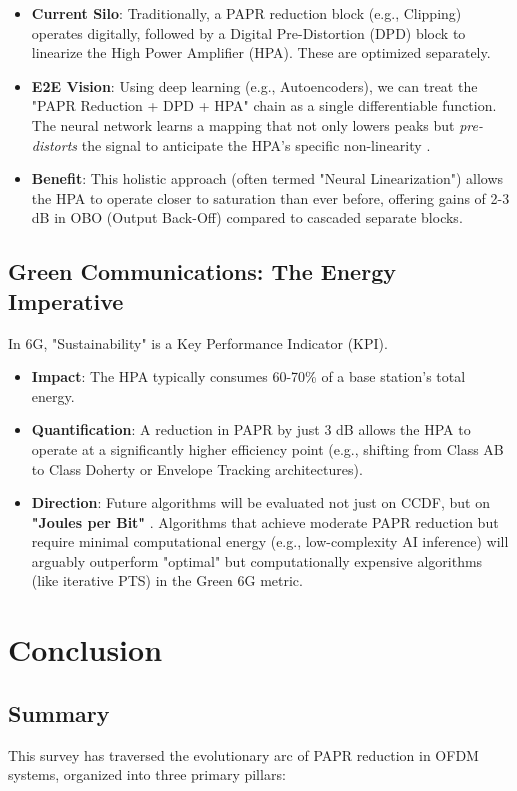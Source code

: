 \documentclass[journal]{IEEEtran}
\begin{document}
\begin{itemize}
    \item \textbf{Current Silo}: Traditionally, a PAPR reduction block (e.g., Clipping) operates digitally, followed by a Digital Pre-Distortion (DPD) block to linearize the High Power Amplifier (HPA). These are optimized separately.
    \item \textbf{E2E Vision}: Using deep learning (e.g., Autoencoders), we can treat the "PAPR Reduction + DPD + HPA" chain as a single differentiable function. The neural network learns a mapping that not only lowers peaks but \textit{pre-distorts} the signal to anticipate the HPA's specific non-linearity \cite{ref13}.
    \item \textbf{Benefit}: This holistic approach (often termed "Neural Linearization") allows the HPA to operate closer to saturation than ever before, offering gains of 2-3 dB in OBO (Output Back-Off) compared to cascaded separate blocks.
\end{itemize}

\subsection{Green Communications: The Energy Imperative}
In 6G, "Sustainability" is a Key Performance Indicator (KPI).

\begin{itemize}
    \item \textbf{Impact}: The HPA typically consumes 60-70\% of a base station's total energy.
    \item \textbf{Quantification}: A reduction in PAPR by just 3 dB allows the HPA to operate at a significantly higher efficiency point (e.g., shifting from Class AB to Class Doherty or Envelope Tracking architectures).
    \item \textbf{Direction}: Future algorithms will be evaluated not just on CCDF, but on \textbf{"Joules per Bit"} \cite{ref14}. Algorithms that achieve moderate PAPR reduction but require minimal computational energy (e.g., low-complexity AI inference) will arguably outperform "optimal" but computationally expensive algorithms (like iterative PTS) in the Green 6G metric.
\end{itemize}

\section{Conclusion}

\subsection{Summary}
This survey has traversed the evolutionary arc of PAPR reduction in OFDM systems, organized into three primary pillars:
\end{document}
